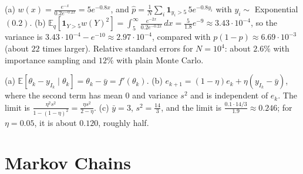 \documentclass[11pt]{article}
\newcommand{\E}{\mathbb{E}}
\begin{document}
\begin{description}[leftmargin=0pt, itemsep=0.3em]
    \item[\ref{pr:importance}.] (a) $w(x) = \frac{e^{-x}}{0.2e^{-0.2x}} = 5e^{-0.8x}$, and $\hat p = \frac{1}{N}\sum_i \mathbf{1}_{y_i > 5}\,5e^{-0.8y_i}$ with $y_i \sim$ Exponential$(0.2)$. (b) $\E_q[\mathbf{1}_{Y > 5}w(Y)^2] = \int_5^\infty \frac{e^{-2x}}{0.2e^{-0.2x}}\, dx = \frac{5}{1.8}e^{-9} \approx 3.43 \cdot 10^{-4}$, so the variance is $3.43 \cdot 10^{-4} - e^{-10} \approx 2.97 \cdot 10^{-4}$, compared with $p(1 - p) \approx 6.69 \cdot 10^{-3}$ (about $22$ times larger). Relative standard errors for $N = 10^4$: about $2.6\%$ with importance sampling and $12\%$ with plain Monte Carlo.
    \item[\ref{pr:sgd-practice}.] (a) $\E[\theta_k - y_{I_k} \mid \theta_k] = \theta_k - \bar y = f'(\theta_k)$. (b) $e_{k+1} = (1 - \eta)e_k + \eta(y_{I_k} - \bar y)$, where the second term has mean $0$ and variance $s^2$ and is independent of $e_k$. The limit is $\frac{\eta^2s^2}{1 - (1 - \eta)^2} = \frac{\eta s^2}{2 - \eta}$. (c) $\bar y = 3$, $s^2 = \frac{14}{3}$, and the limit is $\frac{0.1 \cdot 14/3}{1.9} \approx 0.246$; for $\eta = 0.05$, it is about $0.120$, roughly half.
\end{description}

\section*{Markov Chains}
\end{document}
